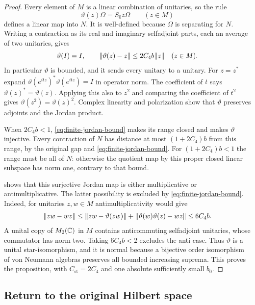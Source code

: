 \begin{proof}
Every element of $M$ is a linear combination of unitaries, so the rule
\begin{equation}
 \vartheta(z)\Omega=S_0z\Omega\qquad(z\in M)
 \label{eq:finite-jordan-map}
\end{equation}
defines a linear map into $N$.  It is well-defined because $\Omega$
is separating for $N$.  Writing a contraction as its real and imaginary
selfadjoint parts, each an average of two unitaries, gives
\begin{equation}
 \vartheta(I)=I,\qquad
 \lVert\vartheta(z)-z\rVert\le 2C_4b\lVert z\rVert\quad(z\in M).
 \label{eq:finite-jordan-bound}
\end{equation}
In particular $\vartheta$ is bounded, and it sends every unitary to a
unitary.  For $z=z^*$ expand
$\vartheta(e^{itz})^*\vartheta(e^{itz})=I$ in operator norm.  The
coefficient of $t$ says $\vartheta(z)^*=\vartheta(z)$.  Applying this
also to $z^2$ and comparing the coefficient of $t^2$ gives
$\vartheta(z^2)=\vartheta(z)^2$.  Complex linearity and polarization
show that $\vartheta$ preserves adjoints and the Jordan product.

When $2C_4b<1$, \eqref{eq:finite-jordan-bound} makes its range closed
and makes $\vartheta$ injective.  Every contraction of $N$ has distance
at most $(1+2C_4)b$ from this range, by the original gap and
\eqref{eq:finite-jordan-bound}.  For $(1+2C_4)b<1$ the range must be
all of $N$: otherwise the quotient map by this proper closed linear
subspace has norm one, contrary to that bound.

 shows that this surjective Jordan map is either
multiplicative or antimultiplicative.  The latter possibility is excluded
by \eqref{eq:finite-jordan-bound}.  Indeed, for unitaries $z,w\in M$
antimultiplicativity would give
\[
 \lVert zw-wz\rVert\le\lVert zw-\vartheta(zw)\rVert
    +\lVert\vartheta(w)\vartheta(z)-wz\rVert
 \le6C_4b.
\]
A unital copy of $M_2(\mathbb C)$ in $M$ contains anticommuting selfadjoint
unitaries, whose commutator has norm two.  Taking $6C_4b<2$ excludes
the anti case.  Thus $\vartheta$ is a unital star-isomorphism, and it
is normal because a bijective order isomorphism of von Neumann algebras
preserves all bounded increasing suprema.  This proves the proposition,
with $C_{\mathrm{st}}=2C_4$ and one absolute sufficiently small $b_0$.
\end{proof}

\subsection{Return to the original Hilbert space}

